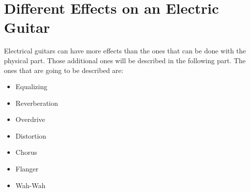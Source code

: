 

\section{Different Effects on an Electric Guitar} \label{sec:effects}

Electrical guitars can have more effects than the ones that can be done with the physical part. Those additional ones will be described in the following part. The ones that are going to be described are:

\begin{itemize}
 \item Equalizing
 \item Reverberation
 \item Overdrive
 \item Distortion
 \item Chorus
 \item Flanger
 \item Wah-Wah
\end{itemize}


\newpage

\label{sec:equalizing} 
\label{sec:delay} 
\label{sec:reverberation} 
\label{sec:overdrive} 
\label{sec:chorus} 
\label{sec:wah-wah} 
